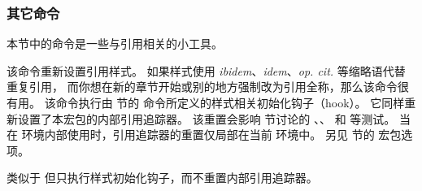\subsubsection{其它命令}%
\label{use:cit:msc}


本节中的命令是一些与引用相关的小工具。

\begin{ltxsyntax}



该命令重新设置引用样式。
如果样式使用 \emph{ibidem}、\emph{idem}、\emph{op. cit.} 等缩略语代替重复引用，
而你想在新的章节开始或别的地方强制改为引用全称，那么该命令很有用。
该命令执行由  节的  命令所定义的样式相关初始化钩子（hook）。
它同样重新设置了本宏包的内部引用追踪器。
该重置会影响  节讨论的 、、 和  等测试。
当在  环境内部使用时，引用追踪器的重置仅局部在当前  环境中。
另见  节的  宏包选项。



类似于  但只执行样式初始化钩子，而不重置内部引用追踪器。


\end{ltxsyntax}
